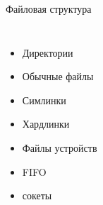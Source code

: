 \documentclass[ignorenonframetext, professionalfonts, hyperref={pdftex, unicode}]{beamer}
\begin{document}
\begin{frame}{Файловая структура}
\begin{columns}
		\begin{itemize}
			\item Директории
			\item Обычные файлы
			\item Симлинки
			\item Хардлинки
			\item Файлы устройств
			\item FIFO
			\item сокеты
		\end{itemize}
	\end{columns}
\end{frame}
\end{document}
